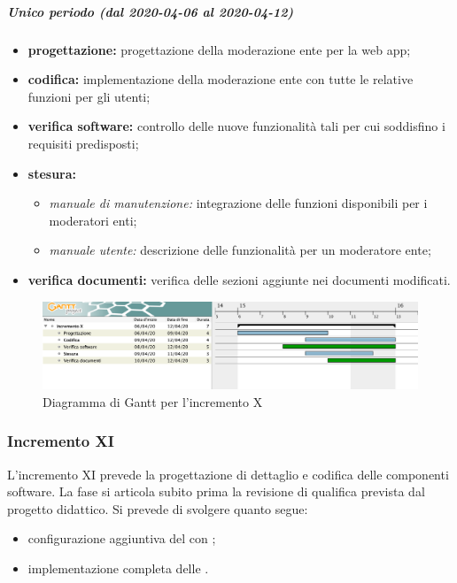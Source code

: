 				\subparagraph{Unico periodo (dal 2020-04-06 al 2020-04-12)}
				
					\begin{itemize}
						\item \textbf{progettazione:} progettazione della moderazione ente per la web app;
						\item \textbf{codifica:} implementazione della moderazione ente con tutte le relative funzioni per gli utenti;
						\item \textbf{verifica software:} controllo delle nuove funzionalità tali per cui soddisfino i requisiti predisposti;
						\item \textbf{stesura:}
						\begin{itemize}
							\item \textit{manuale di manutenzione:} integrazione delle funzioni disponibili per i moderatori enti;
							\item \textit{manuale utente:} descrizione delle funzionalità per un moderatore ente;
						\end{itemize}
						\item \textbf{verifica documenti:} verifica delle sezioni aggiunte nei documenti modificati.
					\end{itemize} 			

		\begin{landscape}
          \begin{figure}[H]
            \centering
            \includegraphics[width=\linewidth]{images/gantt/incrementoX} %
            \caption{Diagramma di Gantt per l'incremento X}
          \end{figure}		
		\end{landscape}

			
		\subsubsection{Incremento XI}
			
			L'incremento XI prevede la progettazione di dettaglio e codifica delle componenti software. La fase si articola subito prima la revisione di qualifica prevista dal progetto didattico. Si prevede di svolgere quanto segue:
			\begin{itemize}
				\item configurazione aggiuntiva del  con ;
				\item implementazione completa delle .
			\end{itemize}
			

